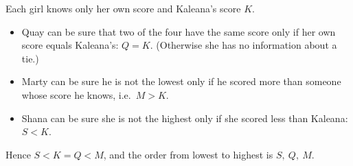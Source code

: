 Each girl knows only her own score and Kaleana's score $K$.
\begin{itemize}
\item Quay can be sure that two of the four have the same score only if her own score equals Kaleana's: $Q=K$. (Otherwise she has no information about a tie.)
\item Marty can be sure he is not the lowest only if he scored more than someone whose score he knows, i.e.\ $M>K$.
\item Shana can be sure she is not the highest only if she scored less than Kaleana: $S<K$.
\end{itemize}
Hence $S<K=Q<M$, and the order from lowest to highest is $\boxed{S,\ Q,\ M}$.
